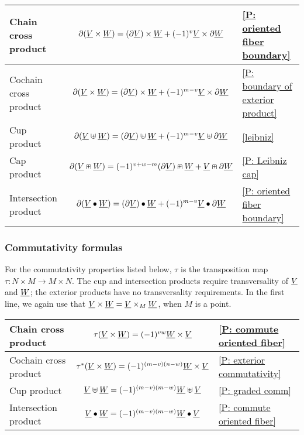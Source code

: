 \begin{center}
	\begin{tabular}{|l|c|l|}
		\hline
		Chain cross product &$\partial(\underline{V} \times \underline{W}) = (\partial \underline{V}) \times \underline{W}+ (-1)^{v}\underline{V} \times \partial \underline{W}$&\cref{P: oriented fiber boundary}\\
		\hline
		Cochain cross product&$\partial(\underline{V} \times \underline{W}) = (\partial \underline{V}) \times \underline{W}+ (-1)^{m-v}\underline{V} \times \partial \underline{W}$&\cref{P: boundary of exterior product}\\
		\hline
		Cup product&$\partial (\underline{V} \uplus \underline{W}) = (\partial \underline{V}) \uplus \underline{W}+ (-1)^{m-v} \underline{V} \uplus \partial \underline{W}$&\cref{leibniz}\\
		\hline
		Cap product&$\partial(\underline{V}\nplus \underline{W}) = (-1)^{v+w-m} (\partial \underline{V})\nplus \underline{W} + \underline{V}\nplus\partial \underline{W}$&\cref{P: Leibniz cap}\\
		\hline
		Intersection product &$\partial (\underline{V} \bullet \underline{W}) = (\partial \underline{V}) \bullet \underline{W} + (-1)^{m-v}\underline{V} \bullet \partial \underline{W}$&\cref{P: oriented fiber boundary}\\
		\hline
	\end{tabular}
\end{center}

\subsubsection{Commutativity formulas}

For the commutativity properties listed below, $\tau$ is the transposition map $\tau \colon N \times M \to M \times N$.
The cup and intersection products require transversality of $\underline{V}$ and $\underline{W}$; the exterior products have no transversality requirements.
In the first line, we again use that $\underline{V} \times \underline{W} = \underline{V} \times_M \underline{W}$, when $M$ is a point.

\begin{center}
	\begin{tabular}{|l|c|l|}
		\hline
		Chain cross product&$\tau(\underline{V} \times \underline{W}) = (-1)^{vw}\underline{W} \times \underline{V}$&\cref{P: commute oriented fiber}\\
		\hline
		Cochain cross product&$\tau^*(\underline{V} \times \underline{W}) = (-1)^{(m-v)(n-w)}\underline{W} \times \underline{V}$&\cref{P: exterior commutativity}\\
		\hline
		Cup product&$\underline{V}\uplus \underline{W} = (-1)^{(m-v)(m-w)} \underline{W}\uplus \underline{V}$&\cref{P: graded comm}\\
		\hline
		Intersection product&$\underline{V}\bullet \underline{W} = (-1)^{(m-v)(m-w)}\underline{W}\bullet \underline{V}$&\cref{P: commute oriented fiber}\\
		\hline
	\end{tabular}
\end{center}

